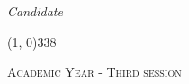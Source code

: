 \begin{titlepage}
\begin{center}
\begin{large}
\vspace{0pt} 

\begin{flushright}
\textit{Candidate}\\
\vspace{5pt} 
\myName
\end{flushright}
\end{large}

\vspace{20pt}

\line(1, 0){338} \\
\begin{normalsize}
\textsc{Academic Year \myAA - Third session}
\end{normalsize}

\end{center}
\end{titlepage}